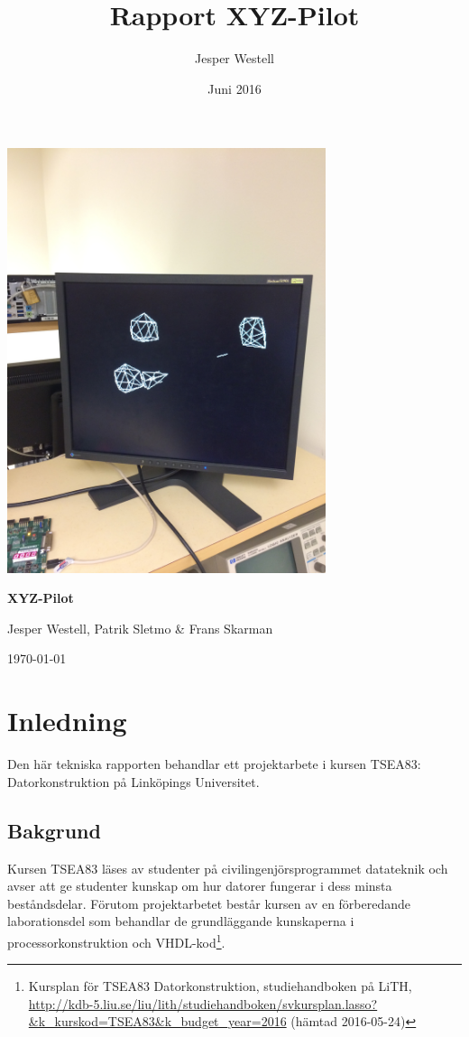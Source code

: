 \documentclass[a4paper]{article}
\title{Rapport XYZ-Pilot}
\author{Jesper Westell}
\date{Juni 2016}
\begin{document}
    \begin{titlepage}

    	\vspace{2cm}
        \centering
        \includegraphics[width=0.7\textwidth]{title_img.jpeg} \par
    	{\huge\bfseries XYZ-Pilot\par}
        \vspace{1cm}
        \large{Jesper Westell, Patrik Sletmo \& Frans Skarman}

    	\vfill

        \large{\today}
    \end{titlepage}

    \tableofcontents
    \newpage
    
    \section{Inledning}
    Den här tekniska rapporten behandlar ett projektarbete i kursen TSEA83:
    Datorkonstruktion på Linköpings Universitet.





    \subsection{Bakgrund}
    Kursen TSEA83 läses av studenter på civilingenjörsprogrammet datateknik och
    avser att ge studenter kunskap om hur datorer fungerar i dess minsta
    beståndsdelar. Förutom projektarbetet består kursen av en förberedande
    laborationsdel som behandlar de grundläggande kunskaperna i
    processorkonstruktion och VHDL-kod\footnote{Kursplan för TSEA83 Datorkonstruktion, 
    studiehandboken på LiTH, \url{http://kdb-5.liu.se/liu/lith/studiehandboken/svkursplan.lasso?&k_kurskod=TSEA83&k_budget_year=2016}
    (hämtad 2016-05-24)}.
    
\end{document}
